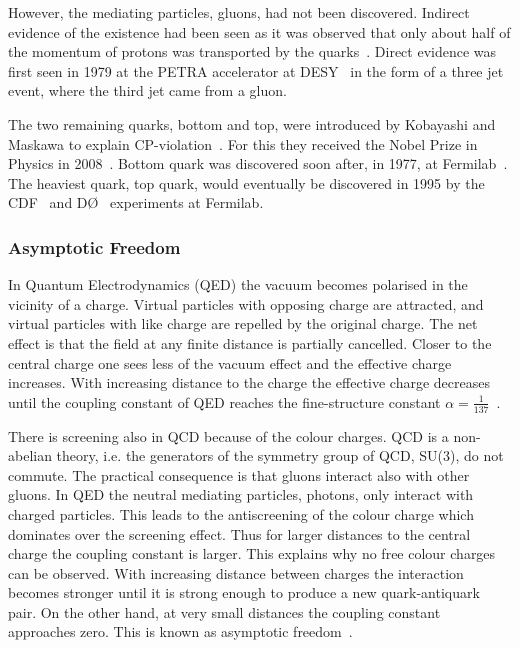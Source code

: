 However, the mediating particles, gluons, had not been discovered. Indirect evidence of the existence had been seen as it was observed that only about half of the momentum of protons was transported by the quarks~\cite{25gluons}. Direct evidence was first seen in 1979 at the PETRA accelerator at DESY~\cite{Brandelik:1979bd, PhysRev.43.830, Berger1979418} in the form of a three jet event, where the third jet came from a gluon.

The two remaining quarks, bottom and top, were introduced by Kobayashi and Maskawa to explain CP-violation~\cite{Kobayashi:1973fv}. For this they received the Nobel Prize in Physics in 2008~\cite{Nobel2008}. Bottom quark was discovered soon after, in 1977, at Fermilab~\cite{Herb:1977ek}. The heaviest quark, top quark, would eventually be discovered in 1995 by the CDF~\cite{Abe:1995hr} and DØ~\cite{Abachi:1994td} experiments at Fermilab.




\subsubsection{Asymptotic Freedom}
In Quantum Electrodynamics (QED) the vacuum becomes polarised in the vicinity of a charge. Virtual particles with opposing charge are attracted, and virtual particles with like charge are repelled by the original charge. The net effect is that the field at any finite distance is partially cancelled. Closer to the central charge one sees less of the vacuum effect and the effective charge increases. With increasing distance to the charge the effective charge decreases until the coupling constant of QED reaches the fine-structure constant $\alpha=\frac{1}{137}$~\cite{Perkins:1982xb}.




There is screening also in QCD because of the colour charges. QCD is a non-abelian theory, i.e. the generators of the symmetry group of QCD, SU(3), do not commute. The practical consequence is that gluons interact also with other gluons. In QED the neutral mediating particles, photons, only interact with charged particles. This leads to the antiscreening of the colour charge which dominates over the screening effect. Thus for larger distances to the central charge the coupling constant is larger. This explains why no free colour charges can be observed. With increasing distance between charges the interaction becomes stronger until it is strong enough to produce a new quark-antiquark pair. On the other hand, at very small distances the coupling constant approaches zero. This is known as asymptotic freedom~\cite{Perkins:1982xb}.

